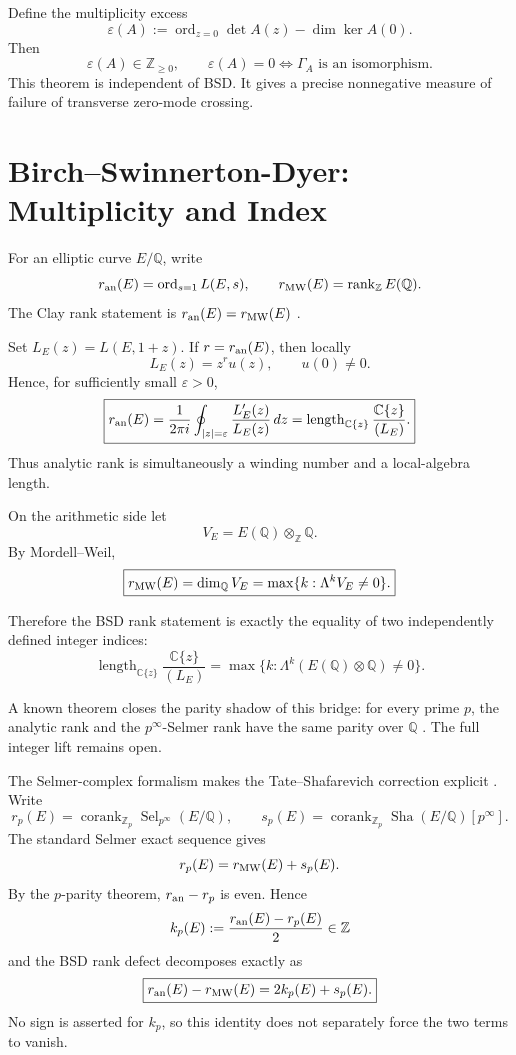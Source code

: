 \documentclass[11pt]{article}
\newcommand{\Sha}{\operatorname{Sha}}
\begin{document}
Define the multiplicity excess
\[
\varepsilon(A):=
\operatorname{ord}_{z=0}\det A(z)-\dim\ker A(0).
\]
Then
\[
\boxed{\varepsilon(A)\in\mathbb Z_{\ge0},}
\qquad
\boxed{\varepsilon(A)=0\iff\Gamma_A\text{ is an isomorphism}.}
\]
This theorem is independent of BSD. It gives a precise nonnegative measure of failure of transverse zero-mode crossing.

\section{Birch--Swinnerton-Dyer: Multiplicity and Index}

For an elliptic curve \(E/\mathbb Q\), write
\[
r_{\rm an}(E)=\operatorname{ord}_{s=1}L(E,s),
\qquad
r_{\rm MW}(E)=\operatorname{rank}_{\mathbb Z}E(\mathbb Q).
\]
The Clay rank statement is \(r_{\rm an}(E)=r_{\rm MW}(E)\) \cite{WilesBSD2000}.

Set \(L_E(z)=L(E,1+z)\). If \(r=r_{\rm an}(E)\), then locally
\[
L_E(z)=z^r u(z),\qquad u(0)\ne0.
\]
Hence, for sufficiently small \(\varepsilon>0\),
\[
\boxed{
r_{\rm an}(E)
=
\frac{1}{2\pi i}\oint_{|z|=\varepsilon}\frac{L'_E(z)}{L_E(z)}\,dz
=
\operatorname{length}_{\mathbb C\{z\}}
\frac{\mathbb C\{z\}}{(L_E)}.
}
\]
Thus analytic rank is simultaneously a winding number and a local-algebra length.

On the arithmetic side let
\[
V_E=E(\mathbb Q)\otimes_{\mathbb Z}\mathbb Q.
\]
By Mordell--Weil,
\[
\boxed{
r_{\rm MW}(E)
=
\dim_{\mathbb Q}V_E
=
\max\{k:\Lambda^kV_E\ne0\}.
}
\]

Therefore the BSD rank statement is exactly the equality of two independently defined integer indices:
\[
\boxed{
\operatorname{length}_{\mathbb C\{z\}}
\frac{\mathbb C\{z\}}{(L_E)}
=
\max\{k:\Lambda^k(E(\mathbb Q)\otimes\mathbb Q)\ne0\}.
}
\]

A known theorem closes the parity shadow of this bridge: for every prime \(p\), the analytic rank and the \(p^\infty\)-Selmer rank have the same parity over \(\mathbb Q\) \cite{DokchitserDokchitser2010}. The full integer lift remains open.

The Selmer-complex formalism makes the Tate--Shafarevich correction explicit \cite{Nekovar2006}. Write
\[
r_p(E)=\operatorname{corank}_{\mathbb Z_p}\operatorname{Sel}_{p^\infty}(E/\mathbb Q),
\qquad
s_p(E)=\operatorname{corank}_{\mathbb Z_p}\Sha(E/\mathbb Q)[p^\infty].
\]
The standard Selmer exact sequence gives
\[
r_p(E)=r_{\rm MW}(E)+s_p(E).
\]
By the \(p\)-parity theorem, \(r_{\rm an}-r_p\) is even. Hence
\[
k_p(E):=\frac{r_{\rm an}(E)-r_p(E)}{2}\in\mathbb Z
\]
and the BSD rank defect decomposes exactly as
\[
\boxed{
r_{\rm an}(E)-r_{\rm MW}(E)=2k_p(E)+s_p(E).
}
\]
No sign is asserted for \(k_p\), so this identity does not separately force the two terms to vanish.
\end{document}
